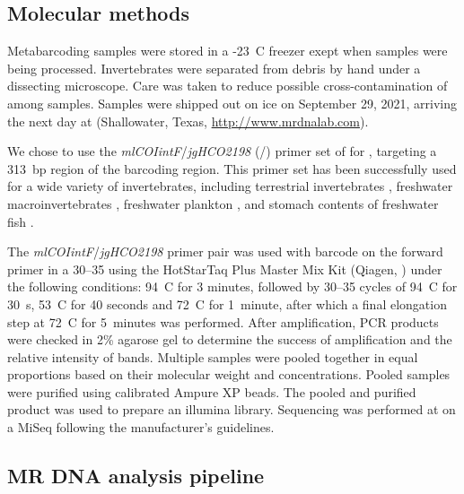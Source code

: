 \begin{multicols}{2}
\subsection{Molecular methods}

Metabarcoding samples were stored in a -23~\textdegree{}C freezer exept when samples were being processed. Invertebrates were separated from debris by hand under a dissecting microscope. Care was taken to reduce possible cross-contamination of  among samples. Samples were shipped out on ice on September 29, 2021, arriving the next day at  (Shallowater, Texas, \url{http://www.mrdnalab.com}).

We chose to use the \textit{mlCOIintF}/\textit{jgHCO2198} (\-/\-) primer set of \citet{Lerayetal2013} for , targeting a 313~bp region of the   barcoding region. This primer set has been successfully used for a wide variety of invertebrates, including terrestrial invertebrates \citep{Bowseretal2020}, freshwater macroinvertebrates \citep{Hajibabaeietal2019}, freshwater plankton \citep{Yangetal2017}, and stomach contents of freshwater fish \citep{BowserBowser2020}.

The \textit{mlCOIintF}/\textit{jgHCO2198} primer pair was used with barcode on the forward primer in a 30--35  using the HotStarTaq Plus Master Mix Kit (Qiagen, ) under the following conditions: 94~\textdegree{}C for 3 minutes, followed by 30--35 cycles of 94~\textdegree{}C for 30~s, 53~\textdegree{}C for 40 seconds and 72~\textdegree{}C for 1~minute, after which a final elongation step at 72~\textdegree{}C for 5~minutes was performed.  After amplification, PCR products were checked in 2\% agarose gel to determine the success of amplification and the relative intensity of bands. Multiple samples were pooled together in equal proportions based on their molecular weight and  concentrations. Pooled samples were purified using calibrated Ampure XP beads. The pooled and purified  product was used to prepare an illumina  library. Sequencing was performed at  on a MiSeq following the manufacturer’s guidelines. 

\subsection{MR DNA analysis pipeline}


\end{multicols}
